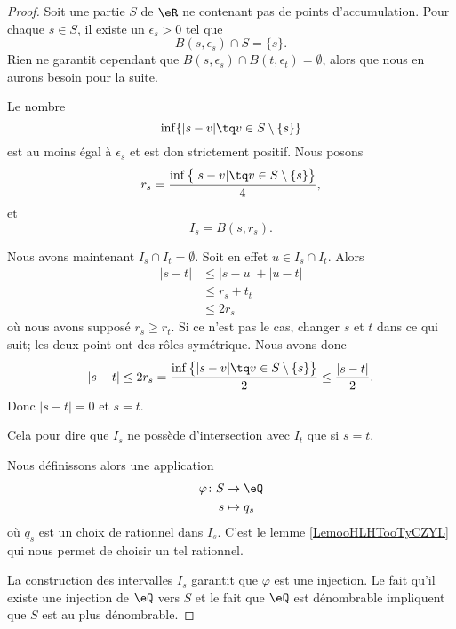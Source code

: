 \begin{proof}
	Soit une partie \( S\) de \( \eR\) ne contenant pas de points d'accumulation. Pour chaque \( s\in S\), il existe un \( \epsilon_s>0\) tel que
	\begin{equation}
		B(s,\epsilon_s)\cap S=\{ s \}.
	\end{equation}
	Rien ne garantit cependant que \( B(s,\epsilon_s)\cap B(t,\epsilon_{t})=\emptyset\), alors que nous en aurons besoin pour la suite.

	Le nombre
	\begin{equation}
		\inf\{ | s-v |\tq v\in S\setminus\{ s \}  \}
	\end{equation}
	est au moins égal à \( \epsilon_s\) et est don strictement positif. Nous posons
	\begin{equation}
		r_s=\frac{ \inf\big\{ | s-v |\tq v\in S\setminus\{ s \}  \big\} }{ 4 },
	\end{equation}
	et
	\begin{equation}
		I_s=B(s,r_s).
	\end{equation}

	Nous avons maintenant \( I_s\cap I_t=\emptyset\). Soit en effet \( u\in I_s\cap I_t\). Alors
	\begin{subequations}
		\begin{align}
			| s-t | & \leq | s-u |+| u-t | \\
			        & \leq r_s+t_t         \\
			        & \leq 2r_s
		\end{align}
	\end{subequations}
	où nous avons supposé \( r_s\geq r_t\). Si ce n'est pas le cas, changer \( s\) et \( t\) dans ce qui suit; les deux point ont des rôles symétrique. Nous avons donc
	\begin{equation}
		| s-t |\leq 2r_s=\frac{ \inf\big\{ | s-v |\tq v\in S\setminus\{ s \}  \big\} }{ 2 }\leq \frac{ | s-t | }{ 2 }.
	\end{equation}
	Donc \( | s-t |=0\) et \( s=t\).

	Cela pour dire que \( I_s\) ne possède d'intersection avec \( I_t\) que si \( s=t\).

	Nous définissons alors une application
	\begin{equation}
		\begin{aligned}
			\varphi\colon S & \to \eQ     \\
			s               & \mapsto q_s
		\end{aligned}
	\end{equation}
	où \( q_s\) est un choix de rationnel dans \( I_s\). C'est le lemme \ref{LemooHLHTooTyCZYL} qui nous permet de choisir un tel rationnel.

	La construction des intervalles \( I_s\) garantit que \( \varphi \) est une injection. Le fait qu'il existe une injection de \( \eQ\) vers \( S\) et le fait que \( \eQ\) est dénombrable impliquent que \( S\) est au plus dénombrable.
\end{proof}
